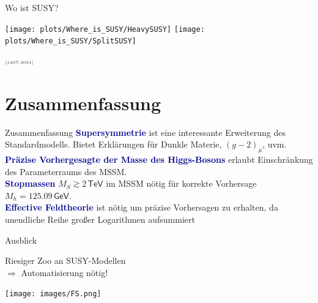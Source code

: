 \documentclass[hyperref={pdfpagelabels=false},ngerman]{beamer}
\newcommand{\eh}[1]{\,\mathsf{#1}}
\newcommand{\MS}{\ensuremath{M_S}}
\newcommand{\mycite}[1]{\ensuremath{\text{\textcolor{darkgray}{\tiny [#1]}}}}
\renewcommand{\emph}[1]{\textbf{\textcolor{darkblue}{#1}}}
\newcommand{\GeV}{\eh{GeV}}
\newcommand{\TeV}{\eh{TeV}}
\begin{document}
\begin{frame}{Wo ist SUSY?}
  \begin{center}
    \texttt{[image: plots/Where\_is\_SUSY/HeavySUSY]}\hfill
    \texttt{[image: plots/Where\_is\_SUSY/SplitSUSY]}
  \end{center}
  \raggedleft\mycite{1407.4081}
\end{frame}


\section{Zusammenfassung}

\begin{frame}{Zusammenfassung}
  \emph{Supersymmetrie} ist eine interessante Erweiterung des
  Standardmodells.  Bietet Erklärungen für Dunkle Materie,
  $(g-2)_\mu$, uvm.
  \\[1em]
  \emph{Präzise Vorhergesagte der Masse des Higgs-Bosons} erlaubt
  Einschränkung des Parameterraums des MSSM.
  \\[1em]
  \emph{Stopmassen} $\MS \gtrsim 2\TeV$ im MSSM nötig für korrekte
  Vorhersage $M_h = 125.09\GeV$.
  \\[1em]
  \emph{Effective Feldtheorie} ist nötig um präzise Vorhersagen zu
  erhalten, da unendliche Reihe großer Logarithmen aufsummiert
\end{frame}

\begin{frame}{Ausblick}
  \begin{center}
    \LARGE Riesiger Zoo an SUSY-Modellen\\ $\Rightarrow$ Automatisierung nötig!
  \end{center}
  \begin{center}
    \texttt{[image: images/FS.png]}
  \end{center}
\end{frame}
\end{document}
